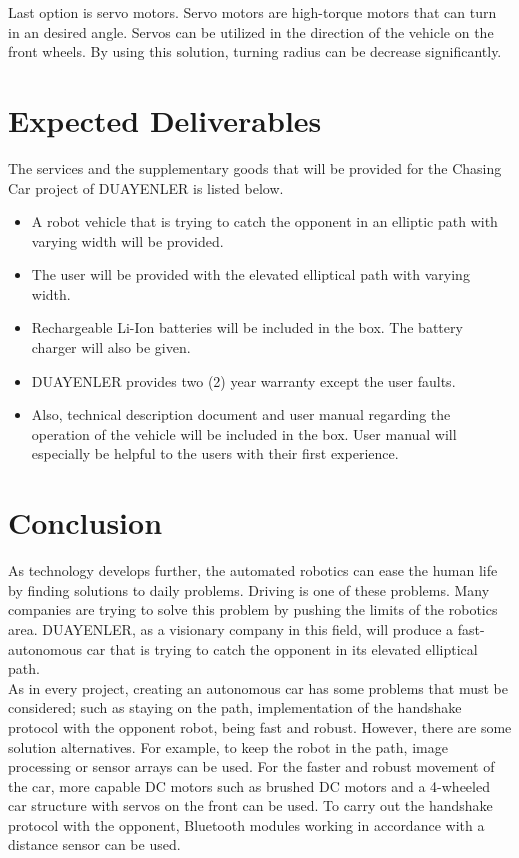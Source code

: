 \documentclass[a4paper,12pt]{article}
\begin{document}
Last option is servo motors. Servo motors are high-torque motors that can turn in an desired angle. Servos can be utilized in the direction of the vehicle on the front wheels. By using this solution, turning radius can be decrease significantly.

\section{Expected Deliverables}

The services and the supplementary goods that will be provided for the Chasing Car project of DUAYENLER is  listed below.
\begin{itemize}
	\item A robot vehicle that is trying to catch the opponent in an elliptic path with varying width will be provided.
	\item The user will be provided with the elevated elliptical path with varying width.
	\item Rechargeable Li-Ion batteries will be included in the box. The battery charger will also be given.
	\item DUAYENLER provides two (2) year warranty except the user faults.
	\item Also, technical description document and user  manual regarding the operation of the vehicle will be included in the box. User manual will especially be helpful to the users with their first experience.
\end{itemize} 


\section{Conclusion}
As technology develops further, the automated robotics can ease the human life by finding solutions to daily problems. Driving is one of these problems. Many companies are trying to solve this problem by pushing the limits of the robotics area. DUAYENLER, as a visionary company in this field, will produce a fast-autonomous car that is trying to catch the opponent in its elevated elliptical path.\\

As in every project, creating an autonomous car has some problems that must be considered; such as staying on the path, implementation of the handshake protocol with the opponent robot, being fast and robust. However, there are some solution alternatives. For example, to keep the robot in the path, image processing or sensor arrays can be used. For the faster and robust movement of the car, more capable DC motors such as brushed DC motors and a 4-wheeled car structure with servos on the front can be used. To carry out the handshake protocol with the opponent, Bluetooth modules working in accordance with a distance sensor can be used.\\
\end{document}
